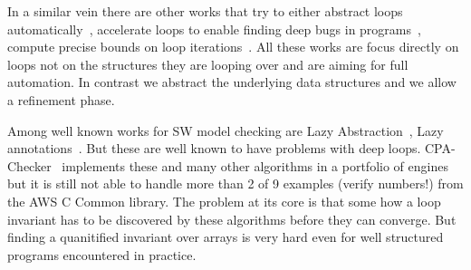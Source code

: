 In a similar vein there are other works that try to either abstract
loops automatically~\cite{loopabs}, accelerate loops to enable finding
deep bugs in programs~\cite{kroeningloops}, compute precise bounds on loop
iterations~\cite{abc}. All these works are focus directly on loops not
on the structures they are looping over and are aiming for full
automation. In contrast we abstract the underlying data structures and
we allow a refinement phase.

Among well known works for SW model checking are Lazy
Abstraction~\cite{lazyabstraction}, Lazy
annotations~\cite{lazyannotations}. But these are well known to have
problems with deep loops. CPA-Checker~\cite{cpachecker1}
implements these and many other algorithms in a portfolio of engines but
it is still not able to handle more than 2 of 9 examples (verify numbers!) from the
AWS C Common library. The problem at its core is that some how a loop
invariant has to be discovered by these algorithms before they can
converge. But finding a quanitified invariant over arrays is very hard
even for well structured programs encountered in practice.
